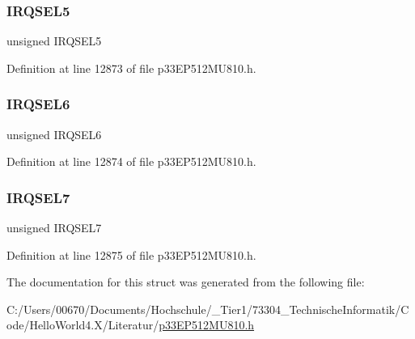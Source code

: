 \subsubsection{\texorpdfstring{I\+R\+Q\+S\+E\+L5}{IRQSEL5}}
{\footnotesize\ttfamily unsigned I\+R\+Q\+S\+E\+L5}



Definition at line 12873 of file p33\+E\+P512\+M\+U810.\+h.

\mbox{\label{structtag_d_m_a3_r_e_q_b_i_t_s_ace52408ef8c29561f3c56a3fbcbc8217}} 
\subsubsection{\texorpdfstring{I\+R\+Q\+S\+E\+L6}{IRQSEL6}}
{\footnotesize\ttfamily unsigned I\+R\+Q\+S\+E\+L6}



Definition at line 12874 of file p33\+E\+P512\+M\+U810.\+h.

\mbox{\label{structtag_d_m_a3_r_e_q_b_i_t_s_acce7dedecdf1f53cdbead3edf7c5d53a}} 
\subsubsection{\texorpdfstring{I\+R\+Q\+S\+E\+L7}{IRQSEL7}}
{\footnotesize\ttfamily unsigned I\+R\+Q\+S\+E\+L7}



Definition at line 12875 of file p33\+E\+P512\+M\+U810.\+h.



The documentation for this struct was generated from the following file\+:\begin{DoxyCompactItemize}
\item 
C\+:/\+Users/00670/\+Documents/\+Hochschule/\+\_\+\+Tier1/73304\+\_\+\+Technische\+Informatik/\+Code/\+Hello\+World4.\+X/\+Literatur/\hyperlink{p33_e_p512_m_u810_8h}{p33\+E\+P512\+M\+U810.\+h}\end{DoxyCompactItemize}
